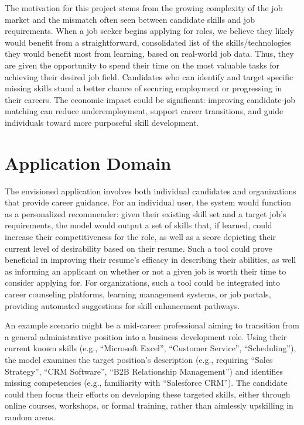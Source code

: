 \documentclass[11pt]{article}
\begin{document}
The motivation for this project stems from the growing complexity of the job market and the mismatch often seen between candidate skills and job requirements. When a job seeker begins applying for roles, we believe they likely would benefit from a straightforward, consolidated list of the skills/technologies they would benefit most from learning, based on real-world job data. Thus, they are given the opportunity to spend their time on the most valuable tasks for achieving their desired job field. Candidates who can identify and target specific missing skills stand a better chance of securing employment or progressing in their careers. The economic impact could be significant: improving candidate-job matching can reduce underemployment, support career transitions, and guide individuals toward more purposeful skill development.
\section{Application Domain}
The envisioned application involves both individual candidates and organizations that provide career guidance. For an individual user, the system would function as a personalized recommender: given their existing skill set and a target job’s requirements, the model would output a set of skills that, if learned, could increase their competitiveness for the role, as well as a score depicting their current level of desirability based on their resume. Such a tool could prove beneficial in improving their resume's efficacy in describing their abilities, as well as informing an applicant on whether or not a given job is worth their time to consider applying for. For organizations, such a tool could be integrated into career counseling platforms, learning management systems, or job portals, providing automated suggestions for skill enhancement pathways.

An example scenario might be a mid-career professional aiming to transition from a general administrative position into a business development role. Using their current known skills (e.g., ``Microsoft Excel'', ``Customer Service'', ``Scheduling''), the model examines the target position’s description (e.g., requiring ``Sales Strategy'', ``CRM Software'', ``B2B Relationship Management'') and identifies missing competencies (e.g., familiarity with ``Salesforce CRM''). The candidate could then focus their efforts on developing these targeted skills, either through online courses, workshops, or formal training, rather than aimlessly upskilling in random areas.
\end{document}
